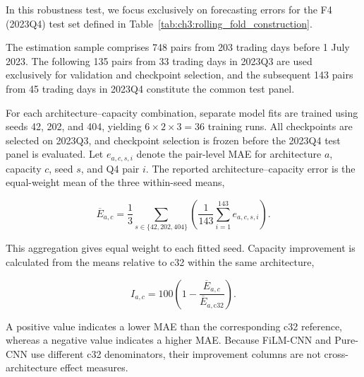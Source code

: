 In this robustness test, we focus exclusively on forecasting errors for the
F4 (2023Q4) test set defined in
Table~\ref{tab:ch3:rolling_fold_construction}.

The estimation sample comprises 748 pairs from 203 trading days before 1 July 2023. The following 135 pairs from 33 trading days in 2023Q3 are used exclusively for validation and checkpoint selection, and the subsequent 143 pairs from 45 trading days in 2023Q4 constitute
the common test panel.  

For each architecture--capacity combination, separate model fits are trained
using seeds 42, 202, and 404, yielding $6\times2\times3=36$ training runs.  All
checkpoints are selected on 2023Q3, and checkpoint selection is frozen before the
2023Q4 test panel is evaluated.  Let $e_{a,c,s,i}$ denote the pair-level MAE for
architecture $a$, capacity $c$, seed $s$, and Q4 pair $i$.  The reported
architecture--capacity error is the equal-weight mean of the three within-seed
means,

\[
\overline E_{a,c}
=
\frac{1}{3}\sum_{s\in\{42,202,404\}}
\left(
\frac{1}{143}\sum_{i=1}^{143} e_{a,c,s,i}
\right).
\]

This aggregation gives equal weight to each fitted seed. Capacity improvement
is calculated from the means relative to c32 within the same
architecture,

\[
I_{a,c}
=
100\left(
1-\frac{\overline E_{a,c}}{\overline E_{a,\mathrm{c32}}}
\right).
\]

A positive value indicates a lower MAE than the corresponding c32 reference,
whereas a negative value indicates a higher MAE.  Because FiLM-CNN and
Pure-CNN use different c32 denominators, their improvement columns are not
cross-architecture effect measures.


